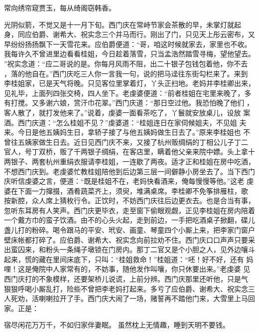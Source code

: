 常向绣帘窥贾玉，每从绮阁窃韩香。

光阴似箭，不觉又是十一月下旬。西门庆在常峙节家会茶散的早，未掌灯就起
身，同应伯爵、谢希大、祝实念三个并马而行。刚出了门，只见天上彤云密布，又
早纷纷扬扬飘下一天雪花来。应伯爵便道：“哥，咱这时候就家去，家里也不收。
我每许久不曾进里边看看桂姐，今日趁着落雪，只当孟浩然踏雪寻梅，望他望去。
”祝实念道：“应二哥说的是。你每月风雨不阻，出二十银子包钱包着他，你不去
，落的他自在。”西门庆吃三人你一言我一句，说的把马迳往东街勾栏来了。来到
李桂姐家，已是天气将晚。只见客位里掌着灯，丫头正扫地。老妈并李桂卿出来，
见礼毕，上面列四张交椅，四人坐下。老虔婆便道：“前者桂姐在宅里来晚了，多
有打搅。又多谢六娘，赏汗巾花翠。”西门庆道：“那日空过他。我恐怕晚了他们
，客人散了，就打发他来了。”说着，虔婆一面看茶吃了，丫鬟就安放桌儿，设放
案酒。西门庆道：“怎么桂姐不见？”虔婆道：“桂姐连日在家伺候姐夫，不见姐
夫来。今日是他五姨妈生日，拿轿子接了与他五姨妈做生日去了。”原来李桂姐也
不曾往五姨家做生日去。近日见西门庆不来，又接了杭州贩绸绢的丁相公儿子丁二
官人，号丁双桥，贩了千两银子绸绢，在客店里，瞒着他父亲来院中嫖。头上拿十
两银子、两套杭州重绢衣服请李桂姐，一连歇了两夜。适才正和桂姐在房中吃酒，
不想西门庆到。老虔婆忙教桂姐陪他到后边第三层一间僻静小房坐去了。当下西门
庆听信虔婆之言，便道：“既是桂姐不在，老妈快看酒来，俺每慢慢等他。”这老
虔婆在下面一力撺掇，酒肴蔬菜齐上，须臾，堆满桌席。李桂卿不免筝排雁柱，歌
按新腔，众人席上猜枚行令。正饮时，不妨西门庆往后边更衣去。也是合当有事，
忽听东耳房有人笑声。西门庆更毕衣，走至窗下偷眼观觑，正见李桂姐在房内陪着
一个戴方巾的蛮子饮酒。由不的心头火起，走到前边，一手把吃酒桌子掀翻，碟儿
盏儿打的粉碎。喝令跟马的平安、玳安、画童、琴童四个小厮上来，把李家门窗户
壁床帐都打碎了。应伯爵、谢希大、祝实念向前拉劝不住。西门庆口口声声只要采
出蛮囚来，和粉头一条绳子墩锁在门房内。那丁二官又是个小胆之人，见外边嚷斗
起来，慌的藏在里间床底下，只叫：“桂姐救命！”桂姐道：“呸！好不好，还有
妈哩！这是俺院中人家常有的，不妨事，随他发作叫嚷，你只休要出来。”老虔婆
见西门庆打的不象模样，还要架桥儿说谎，上前分辨。西门庆那里还听他，只是气
狠狠呼喝小厮乱打，险些不曾把李老妈打起来。多亏了应伯爵、谢希大、祝实念三
人死劝，活喇喇拉开了手。西门庆大闹了一场，赌誓再不踏他门来，大雪里上马回
家。正是：

宿尽闲花万万千，不如归家伴妻眠。
虽然枕上无情趣，睡到天明不要钱。
